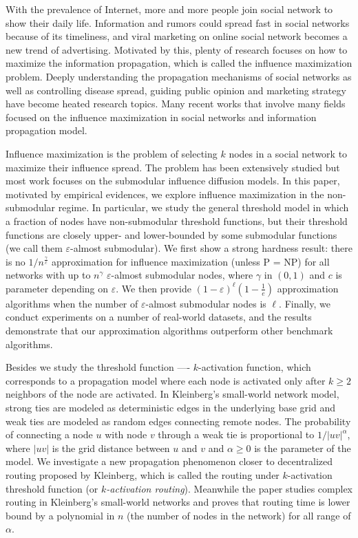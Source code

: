 \begin{englishabstract}

With the prevalence of Internet, more and more people join social network to show their daily life.
Information and rumors could spread fast in social networks because of its timeliness, and viral marketing on online social network becomes a new trend of advertising. 
Motivated by this, plenty of research focuses on how to maximize the information propagation, which is called the influence maximization problem.
Deeply understanding the propagation mechanisms of social networks as well as controlling disease spread,
guiding public opinion and marketing strategy have become heated research topics.
Many recent works that involve many fields focused on the influence maximization in social networks and information propagation model.

Influence maximization is the problem of selecting $k$ nodes in a social network to maximize their influence spread.
The problem has been extensively studied but most work focuses on the submodular influence diffusion models.
In this paper, motivated by empirical evidences, we explore influence maximization in the non-submodular regime.
In particular, we study the general threshold model in which a fraction of nodes have non-submodular threshold
	functions, but their threshold functions are closely upper- and lower-bounded by some submodular
	functions (we call them $\varepsilon$-almost submodular).
We first show a strong hardness result: there is no $1/n^{\frac{\gamma}{c}}$ approximation for influence maximization (unless P = NP)
	for all networks with up to $n^{\gamma}$ $\varepsilon$-almost submodular nodes, where $\gamma$ in $(0,1)$ 
	and $c$ is parameter depending on $\varepsilon$.
We then provide $(1-\varepsilon)^{\ell}(1-\frac{1}{e})$ approximation algorithms when the number of $\varepsilon$-almost submodular nodes is $\ell$.
Finally, we conduct experiments on a number of real-world datasets, and the results demonstrate that our approximation algorithms
	outperform other benchmark algorithms.

Besides we study the threshold function ---- $k$-activation function, 
which corresponds to a propagation model where each node is activated only
after $k \ge 2$ neighbors of the node are activated.
In Kleinberg's small-world network model, strong ties are modeled as deterministic edges in the
underlying base grid and weak ties are modeled as random edges connecting remote nodes.
The probability of connecting a node $u$ with node $v$ through a weak tie is proportional to
$1/|uv|^\alpha$, where $|uv|$ is the grid distance between $u$ and $v$ and $\alpha\ge 0$ is the
parameter of the model.
We investigate a new propagation phenomenon closer to decentralized routing proposed by Kleinberg,
which is called the routing under $k$-activation threshold function (or {\it $k$-activation routing}).
Meanwhile the paper studies complex routing in Kleinberg's small-world networks and proves that
routing time is lower bound by a polynomial in $n$ (the number of nodes in the network) for all range of $\alpha$.


\end{englishabstract}

